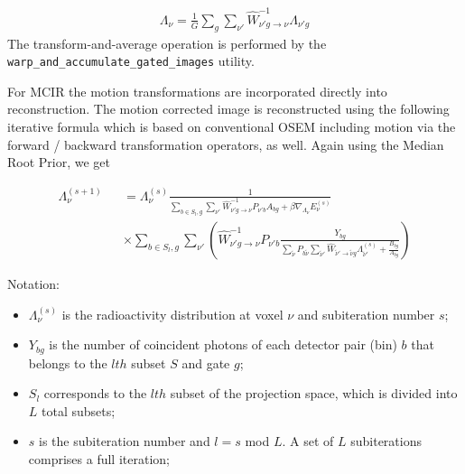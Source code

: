 \documentclass{article}
\begin{document}
{%
\begin{equation}
\begin{array}{rrr}
\Lambda_{\nu}=\frac{1}{G}\sum\limits_{g}\sum\limits_{\nu'}\hat{W}^{-1} _{\nu'g\rightarrow \nu}\Lambda_{\nu'g}
\end{array}
\end{equation}
The transform-and-average operation is performed by the
\texttt{warp\_and\_accumulate\_gated\_images} utility.

For MCIR the motion transformations are incorporated directly into reconstruction. The motion corrected
image is reconstructed using the following iterative formula which is based on conventional OSEM
including motion via the forward / backward transformation operators, as well. Again using the Median Root Prior, we get

\begin{equation}
\begin{array}{lcl}
\Lambda_{\nu}^{(s+1)}&&=\Lambda_{\nu}^{(s)} \frac{1}{ \sum\limits_{b\in S_{l}, g} \sum\limits_{\nu'} \hat{W}^{-1} _{\nu'g\rightarrow \nu}P_{\nu' b}A_{bg}+\beta \nabla_{\Lambda_{\nu}} E_{\nu}^{(s)}}\\
&&\times \sum\limits_{b\in S_{l}, g} \sum\limits_{\nu'}\left(\hat{W}^{-1} _{\nu'g\rightarrow \nu}P_{\nu' b}\frac{Y_{bg}}{\sum\limits_{\tilde{\nu}}P_{b\tilde{\nu}}\sum\limits_{\tilde{\nu}'}\hat{W} _{\tilde{\nu}'\rightarrow \tilde{\nu}g}\Lambda_{\tilde{\nu}'}^{(s)}+\frac{B_{bg}}{A_{bg}}}\right)
\end{array}
\end{equation}



Notation: 
\begin{itemize}
\item $\Lambda_{\nu}^{(s)}$ is the radioactivity distribution at voxel ${\nu}$ and subiteration number $s$;

\item $Y_{bg}$ is the number of coincident photons of each detector pair (bin) $b$ that belongs to the $lth$ subset $S$ and gate $g$;

\item $S_{l}$ corresponds to the $lth$ subset of the projection space, which is divided into $L$ total subsets;

\item $s$ is the subiteration number and $l = s$ mod $L$. A set of $L$ subiterations comprises a full iteration;


\end{itemize}}
\end{document}
